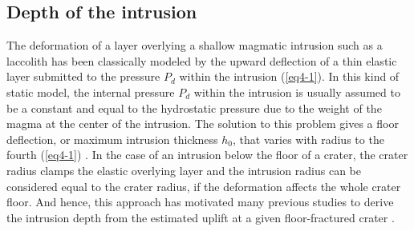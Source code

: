 \begin{article}
        \subsection{Depth of the intrusion}
		
        The  deformation  of  a  layer overlying  a  shallow  magmatic
        intrusion such as a laccolith  has been classically modeled by
        the upward deflection of a thin elastic layer submitted to the
        pressure $P_{d}$  within the intrusion (\ref{eq4-1}).  In this
        kind of static model, the internal pressure $P_{d}$ within the
        intrusion is usually assumed to be a constant and equal to the
        hydrostatic pressure  due to  the weight of  the magma  at the
        center of the intrusion. The  solution to this problem gives a
        floor deflection,  or maximum intrusion thickness  $h_0$, that
        varies    with   radius    to    the   fourth    (\ref{eq4-1})
        \citep{Johnson1973,Pollard1973a}. In the  case of an intrusion
        below  the floor  of a  crater, the  crater radius  clamps the
        elastic  overlying  layer  and  the intrusion  radius  can  be
        considered  equal to  the  crater radius,  if the  deformation
        affects the whole  crater floor. And hence,  this approach has
        motivated many previous studies  to derive the intrusion depth
        from the  estimated uplift  at a given  floor-fractured crater
        \citep{Wichman1996,Jozwiak2012}.
		

\end{article}
